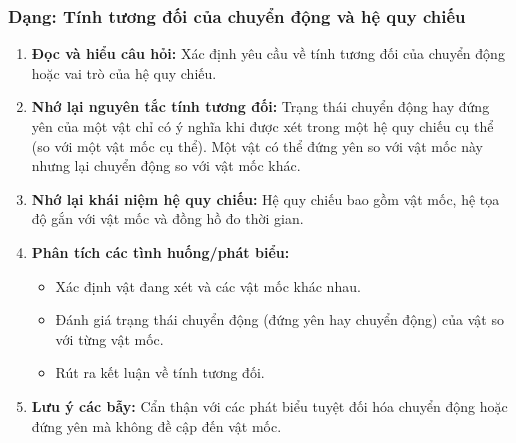 \subsubsection{Dạng: Tính tương đối của chuyển động và hệ quy chiếu}
\begin{phuongphap}
\begin{enumerate}
    \item \textbf{Đọc và hiểu câu hỏi:} Xác định yêu cầu về tính tương đối của chuyển động hoặc vai trò của hệ quy chiếu.
    \item \textbf{Nhớ lại nguyên tắc tính tương đối:} Trạng thái chuyển động hay đứng yên của một vật chỉ có ý nghĩa khi được xét trong một hệ quy chiếu cụ thể (so với một vật mốc cụ thể). Một vật có thể đứng yên so với vật mốc này nhưng lại chuyển động so với vật mốc khác.
    \item \textbf{Nhớ lại khái niệm hệ quy chiếu:} Hệ quy chiếu bao gồm vật mốc, hệ tọa độ gắn với vật mốc và đồng hồ đo thời gian.
    \item \textbf{Phân tích các tình huống/phát biểu:}
    \begin{itemize}
        \item Xác định vật đang xét và các vật mốc khác nhau.
        \item Đánh giá trạng thái chuyển động (đứng yên hay chuyển động) của vật so với từng vật mốc.
        \item Rút ra kết luận về tính tương đối.
    \end{itemize}
    \item \textbf{Lưu ý các bẫy:} Cẩn thận với các phát biểu tuyệt đối hóa chuyển động hoặc đứng yên mà không đề cập đến vật mốc.
\end{enumerate}
\end{phuongphap}
